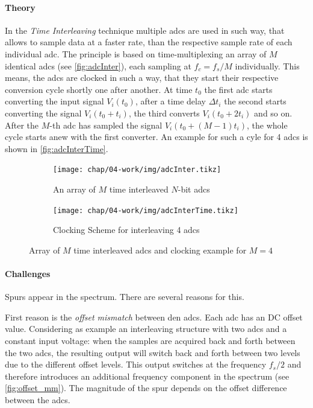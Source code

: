 \paragraph{Theory}
In the \textit{Time Interleaving} technique multiple \glspl{adc} are used in such way, that allows to sample data at a faster rate, than the respective sample rate of each individual \gls{adc}. 
The principle is based on time-multiplexing an array of $M$ identical \glspl{adc} (see \autoref{fig:adcInter}), each sampling at $f_c = f_s/M$ individually. This means, the \glspl{adc} are clocked in such a way, that they start their respective conversion cycle shortly one after another. 
At time $t_0$ the first \gls{adc} starts converting the input signal $V_i(t_0)$, after a time delay $\Delta t_i$ the second starts converting the signal $V_i(t_0 + t_i)$, the third converts $V_i(t_0 + 2t_i)$ and so on. 
After the $M$-th \gls{adc} has sampled the signal $V_i(t_0 + (M-1)t_i)$, the whole cycle starts anew with the first converter. \cite{mangrob}
An example for such a cyle for 4 \glspl{adc} is shown in \autoref{fig:adcInterTime}.

\begin{figure}[tbh]
	\centering
	\begin{subfigure}{\textwidth}
		\centering
		\texttt{[image: chap/04-work/img/adcInter.tikz]}  
		\caption{An array of $M$ time interleaved $N$-bit \glspl{adc} \cite{mangrob}}
		\label{fig:adcInter}
	\end{subfigure}
	\vspace*{2ex}
	\begin{subfigure}{\textwidth}
		\centering
		\tikzexternaldisable
		\texttt{[image: chap/04-work/img/adcInterTime.tikz]}  
		\caption{Clocking Scheme for interleaving 4 \glspl{adc}}
		\tikzexternalenable
		\label{fig:adcInterTime}
	\end{subfigure}
	\caption[Time-Interleaving Method]{Array of $M$ time interleaved \glspl{adc} and clocking example for $M = 4$}
	\label{fig:interleaving}
\end{figure}
\paragraph{Challenges}
Spurs appear in the spectrum. There are several reasons for this.

First reason is the \textit{offset mismatch} between den \glspl{adc}. 
Each \gls{adc} has an DC offset value. Considering as example an interleaving structure with two \glspl{adc} and a constant input voltage: when the samples are acquired back and forth between the two \glspl{adc}, the resulting output will switch back and forth between two levels due to the different offset levels. 
This output switches at the frequency $f_s/2$ and therefore introduces an additional frequency component in the spectrum (see \autoref{fig:offset_mm}). 
The magnitude of the spur depends on the offset difference between the \glspl{adc}. \cite{Harris2019}

